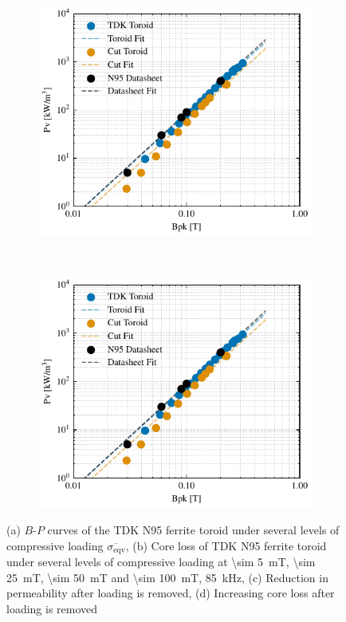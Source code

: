 \documentclass[conference]{IEEEtran}
\begin{document}
\begin{figure}[t]
  \begin{subfigure}{\columnwidth}
    \centering
    \includegraphics{figures/24-09-10_BP_curves.pdf}
    \caption{}
    \label{fig:BPcurves}
  \end{subfigure}~
  \begin{subfigure}{\columnwidth}
    \centering
    \includegraphics{figures/24-09-10_BP_curves.pdf}
    \caption{}
    \label{fig:corelossstress}
  \end{subfigure}
  \caption{(a) $B$-$P$ curves of the TDK N95 ferrite toroid under several levels of compressive loading $\overline{\sigma_\text{eqv}}$, (b) Core loss of TDK N95 ferrite toroid under several levels of compressive loading at \SI{\sim 5}{\milli\tesla}, \SI{\sim 25}{\milli\tesla}, \SI{\sim 50}{\milli\tesla} and \SI{\sim 100}{\milli\tesla}, \SI{85}{\kilo\hertz}, (c) Reduction in permeability after loading is removed, (d) Increasing core loss after loading is removed}
\end{figure}
\end{document}
